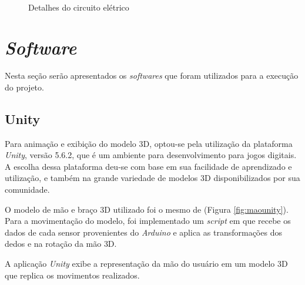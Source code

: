 \begin{figure}[H]
\ContinuedFloat
  \setlength{\abovecaptionskip}{0pt}
  \setlength{\belowcaptionskip}{0pt}
  \caption[Detalhes do circuito elétrico]{Detalhes do circuito elétrico}
  \centering
  \\
  \label{fig:circLuva2}
  \captionsetup{justification=centering}
\end{figure}

\section{\textit{Software}}
\label{sec:software}

Nesta seção serão apresentados os \textit{softwares} que foram utilizados para a execução do projeto.

\subsection{Unity}
\label{sub:unity}
Para animação e exibição do modelo \ac{3D}, optou-se pela utilização da plataforma \textit{Unity}, versão 5.6.2, que é um ambiente para desenvolvimento para jogos digitais. A escolha dessa plataforma deu-se com base em sua facilidade de aprendizado e utilização, e também na grande variedade de modelos \ac{3D} disponibilizados por sua comunidade.

O modelo de mão e braço \ac{3D} utilizado foi o mesmo de  (Figura \ref{fig:maounity}). Para a movimentação do modelo, foi implementado um \textit{script} em \csharp que recebe os dados de cada sensor provenientes do \textit{Arduino} e aplica as transformações dos dedos e na rotação da mão \ac{3D}.

A aplicação \textit{Unity} exibe a representação da mão do usuário em um modelo \ac{3D} que replica os movimentos realizados.

